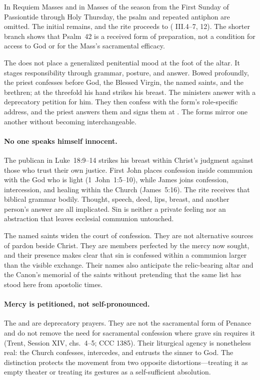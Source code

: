 In Requiem Masses and in Masses of the season from the First Sunday of Passiontide through Holy Thursday, the psalm and repeated antiphon are omitted. The initial  remains, and the rite proceeds to  ( III.4--7, 12). The shorter branch shows that Psalm~42 is a received form of preparation, not a condition for access to God or for the Mass's sacramental efficacy.


The  does not place a generalized penitential mood at the foot of the altar. It stages responsibility through grammar, posture, and answer. Bowed profoundly, the priest confesses before God, the Blessed Virgin, the named saints, and the brethren; at the threefold  his hand strikes his breast. The ministers answer with a deprecatory petition for him. They then confess with the form's role-specific address, and the priest answers them and signs them at . The forms mirror one another without becoming interchangeable.

\paragraph{No one speaks himself innocent.}
The publican in Luke~18:9--14 strikes his breast within Christ's judgment against those who trust their own justice. First John places confession inside communion with the God who is light (1~John~1:5--10), while James joins confession, intercession, and healing within the Church (James~5:16). The rite receives that biblical grammar bodily. Thought, speech, deed, lips, breast, and another person's answer are all implicated. Sin is neither a private feeling nor an abstraction that leaves ecclesial communion untouched.

The named saints widen the court of confession. They are not alternative sources of pardon beside Christ. They are members perfected by the mercy now sought, and their presence makes clear that sin is confessed within a communion larger than the visible exchange. Their names also anticipate the relic-bearing altar and the Canon's memorial of the saints without pretending that the same list has stood here from apostolic times.

\paragraph{Mercy is petitioned, not self-pronounced.}
The  and  are deprecatory prayers. They are not the sacramental form of Penance and do not remove the need for sacramental confession where grave sin requires it (Trent, Session XIV, chs.~4--5; CCC 1385). Their liturgical agency is nonetheless real: the Church confesses, intercedes, and entrusts the sinner to God. The distinction protects the movement from two opposite distortions---treating it as empty theater or treating its gestures as a self-sufficient absolution.

